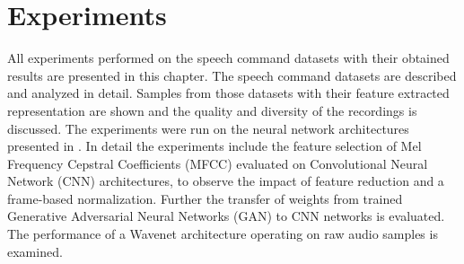 
\chapter{Experiments}\label{sec:exp}
All experiments performed on the speech command datasets with their obtained results are presented in this chapter.
The speech command datasets are described and analyzed in detail.
Samples from those datasets with their feature extracted representation are shown and the quality and diversity of the recordings is discussed.
The experiments were run on the neural network architectures presented in .
In detail the experiments include the feature selection of Mel Frequency Cepstral Coefficients (MFCC) evaluated on Convolutional Neural Network (CNN) architectures, to observe the impact of feature reduction and a frame-based normalization.
Further the transfer of weights from trained Generative Adversarial Neural Networks (GAN) to CNN networks is evaluated.
The performance of a Wavenet architecture operating on raw audio samples is examined.








